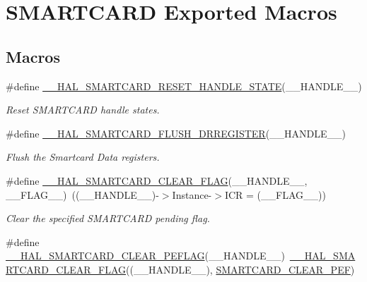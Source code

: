 \hypertarget{group___s_m_a_r_t_c_a_r_d___exported___macros}{}\section{S\+M\+A\+R\+T\+C\+A\+RD Exported Macros}
\label{group___s_m_a_r_t_c_a_r_d___exported___macros}
\subsection*{Macros}
\begin{DoxyCompactItemize}
\item 
\#define \hyperlink{group___s_m_a_r_t_c_a_r_d___exported___macros_ga080b197f190ae36b8db1745a4db94bf4}{\+\_\+\+\_\+\+H\+A\+L\+\_\+\+S\+M\+A\+R\+T\+C\+A\+R\+D\+\_\+\+R\+E\+S\+E\+T\+\_\+\+H\+A\+N\+D\+L\+E\+\_\+\+S\+T\+A\+TE}(\+\_\+\+\_\+\+H\+A\+N\+D\+L\+E\+\_\+\+\_\+)
\begin{DoxyCompactList}\small\item\em Reset S\+M\+A\+R\+T\+C\+A\+RD handle states. \end{DoxyCompactList}\item 
\#define \hyperlink{group___s_m_a_r_t_c_a_r_d___exported___macros_ga942e652bb57d4f12e7273f4e97035ff4}{\+\_\+\+\_\+\+H\+A\+L\+\_\+\+S\+M\+A\+R\+T\+C\+A\+R\+D\+\_\+\+F\+L\+U\+S\+H\+\_\+\+D\+R\+R\+E\+G\+I\+S\+T\+ER}(\+\_\+\+\_\+\+H\+A\+N\+D\+L\+E\+\_\+\+\_\+)
\begin{DoxyCompactList}\small\item\em Flush the Smartcard Data registers. \end{DoxyCompactList}\item 
\#define \hyperlink{group___s_m_a_r_t_c_a_r_d___exported___macros_gab40a9ea5252be0340f074b1cab9c2264}{\+\_\+\+\_\+\+H\+A\+L\+\_\+\+S\+M\+A\+R\+T\+C\+A\+R\+D\+\_\+\+C\+L\+E\+A\+R\+\_\+\+F\+L\+AG}(\+\_\+\+\_\+\+H\+A\+N\+D\+L\+E\+\_\+\+\_\+,  \+\_\+\+\_\+\+F\+L\+A\+G\+\_\+\+\_\+)~((\+\_\+\+\_\+\+H\+A\+N\+D\+L\+E\+\_\+\+\_\+)-\/$>$Instance-\/$>$I\+CR = (\+\_\+\+\_\+\+F\+L\+A\+G\+\_\+\+\_\+))
\begin{DoxyCompactList}\small\item\em Clear the specified S\+M\+A\+R\+T\+C\+A\+RD pending flag. \end{DoxyCompactList}\item 
\#define \hyperlink{group___s_m_a_r_t_c_a_r_d___exported___macros_gae74183878abc11bff63af74fc3ffa3a3}{\+\_\+\+\_\+\+H\+A\+L\+\_\+\+S\+M\+A\+R\+T\+C\+A\+R\+D\+\_\+\+C\+L\+E\+A\+R\+\_\+\+P\+E\+F\+L\+AG}(\+\_\+\+\_\+\+H\+A\+N\+D\+L\+E\+\_\+\+\_\+)~\hyperlink{group___s_m_a_r_t_c_a_r_d___exported___macros_gab40a9ea5252be0340f074b1cab9c2264}{\+\_\+\+\_\+\+H\+A\+L\+\_\+\+S\+M\+A\+R\+T\+C\+A\+R\+D\+\_\+\+C\+L\+E\+A\+R\+\_\+\+F\+L\+AG}((\+\_\+\+\_\+\+H\+A\+N\+D\+L\+E\+\_\+\+\_\+), \hyperlink{group___s_m_a_r_t_c_a_r_d___i_t___c_l_e_a_r___flags_gad589617040e5f426122a23364c377da2}{S\+M\+A\+R\+T\+C\+A\+R\+D\+\_\+\+C\+L\+E\+A\+R\+\_\+\+P\+EF})

\end{DoxyCompactItemize}
